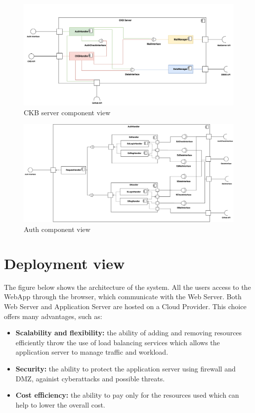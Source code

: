 \begin{figure}[H]
    \centering
    \includegraphics[width=\textwidth]{images/component_view/CKB_component.png}
    \caption{CKB server component view}
\end{figure}

\begin{figure}[H]
    \centering
    \includegraphics[width=\textwidth]{images/component_view/Auth.png}
    \caption{Auth component view}
\end{figure}

\section{Deployment view}
The figure below shows the architecture of the system. All the users access to the WebApp through the browser, which communicate with
the Web Server. Both Web Server and Application Server are hosted on a Cloud Provider. This choice offers many
advantages, such as:

\begin{itemize}
    \item  \textbf{Scalability and flexibility: }the ability of adding and removing resources efficiently throw 
    the use of load balancing services which allows the application server to manage traffic and workload. 
    \item   \textbf{Security: }the ability to protect the application server using firewall and DMZ, againist cyberattacks and possible threats.
    \item   \textbf{Cost efficiency:} the ability to pay only for the resources used which can help to lower the overall cost. 
\end{itemize}

